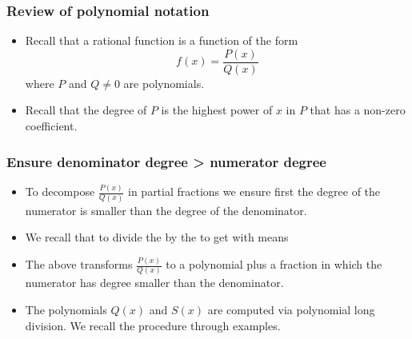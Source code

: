\begin{frame}
\frametitle{Review of polynomial notation}
\begin{itemize}
\item Recall that a rational function is a function of the form
\[
f(x) = \frac{P(x)}{Q(x)}
\]
where $P$ and $Q\neq 0$ are polynomials. 
\item<2->Recall that the degree of $P$ is the highest power of $x$ in $P$ that has a non-zero coefficient.
\end{itemize}
\end{frame}

\begin{frame}\frametitle{Ensure denominator degree > numerator degree}
\begin{itemize}
\item To decompose $\frac{P(x)}{Q(x)}$ in partial fractions we ensure first the degree of the numerator is smaller than the degree of the denominator.
\item<2-> We recall that to divide the  by the  to get  with  means 
\item<10-> The above transforms $\frac{P(x)}{Q(x)}$ to a polynomial plus a fraction in which the numerator has degree smaller than the denominator.
\item<11-> The polynomials $Q(x)$ and $S(x)$ are computed via polynomial long division. We recall the procedure through examples.
\end{itemize}
\end{frame}
